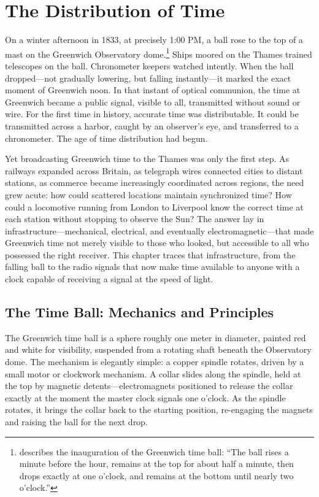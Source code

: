\chapter{The Distribution of Time}
\label{ch:time-distribution}

On a winter afternoon in 1833, at precisely 1:00 PM, a ball rose to the top of a mast on the Greenwich Observatory dome.\footnote{\textcite{Airy1847} describes the inauguration of the Greenwich time ball: ``The ball rises a minute before the hour, remains at the top for about half a minute, then drops exactly at one o'clock, and remains at the bottom until nearly two o'clock.''}  Ships moored on the Thames trained telescopes on the ball. Chronometer keepers watched intently. When the ball dropped—not gradually lowering, but falling instantly—it marked the exact moment of Greenwich noon. In that instant of optical communion, the time at Greenwich became a public signal, visible to all, transmitted without sound or wire. For the first time in history, accurate time was distributable. It could be transmitted across a harbor, caught by an observer's eye, and transferred to a chronometer. The age of time distribution had begun.

Yet broadcasting Greenwich time to the Thames was only the first step. As railways expanded across Britain, as telegraph wires connected cities to distant stations, as commerce became increasingly coordinated across regions, the need grew acute: how could scattered locations maintain synchronized time? How could a locomotive running from London to Liverpool know the correct time at each station without stopping to observe the Sun? The answer lay in infrastructure—mechanical, electrical, and eventually electromagnetic—that made Greenwich time not merely visible to those who looked, but accessible to all who possessed the right receiver. This chapter traces that infrastructure, from the falling ball to the radio signals that now make time available to anyone with a clock capable of receiving a signal at the speed of light.

\section{The Time Ball: Mechanics and Principles}

The Greenwich time ball is a sphere roughly one meter in diameter, painted red and white for visibility, suspended from a rotating shaft beneath the Observatory dome. The mechanism is elegantly simple: a copper spindle rotates, driven by a small motor or clockwork mechanism. A collar slides along the spindle, held at the top by magnetic detents—electromagnets positioned to release the collar exactly at the moment the master clock signals one o'clock. As the spindle rotates, it brings the collar back to the starting position, re-engaging the magnets and raising the ball for the next drop.

